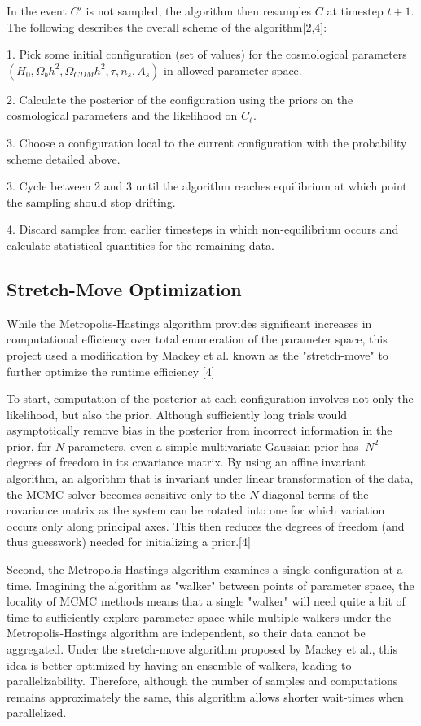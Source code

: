 \documentclass[aps,prd,final,twocolumn]{revtex4}
\begin{document}
In the event $C'$ is not sampled, the algorithm then resamples $C$ at timestep $t+1$. The following describes the overall scheme of the algorithm[2,4]:

1. Pick some initial configuration (set of values) for the cosmological parameters $(H_0, \Omega_b h^2, \Omega_{CDM} h^2, \tau, n_s, A_s)$ in allowed parameter space.

2. Calculate the posterior of the configuration using the priors on the cosmological parameters and the likelihood on $C_{\ell}$.

3. Choose a configuration local to the current configuration with the probability scheme detailed above.

3. Cycle between 2 and 3 until the algorithm reaches equilibrium at which point the sampling should stop drifting.

4. Discard samples from earlier timesteps in which non-equilibrium occurs and calculate statistical quantities for the remaining data.

\subsection{Stretch-Move Optimization}
While the Metropolis-Hastings algorithm provides significant increases in computational efficiency over total enumeration of the parameter space, this project used a modification by Mackey et al. known as the "stretch-move" to further optimize the runtime efficiency [4]

To start, computation of the posterior at each configuration involves not only the likelihood, but also the prior. Although sufficiently long trials would asymptotically remove bias in the posterior from incorrect information in the prior, for $N$ parameters, even a simple multivariate Gaussian prior has $~N^2$ degrees of freedom in its covariance matrix. By using an affine invariant algorithm, an algorithm that is invariant under linear transformation of the data, the MCMC solver becomes sensitive only to the $N$ diagonal terms of the covariance matrix as the system can be rotated into one for which variation occurs only along principal axes. This then reduces the degrees of freedom (and thus guesswork) needed for initializing a prior.[4]

Second, the Metropolis-Hastings algorithm examines a single configuration at a time. Imagining the algorithm as  "walker" between points of parameter space, the locality of MCMC methods means that a single "walker" will need quite a bit of time to sufficiently explore parameter space while multiple walkers under the Metropolis-Hastings algorithm are independent, so their data cannot be aggregated. Under the stretch-move algorithm proposed by Mackey et al., this idea is better optimized by having an ensemble of walkers, leading to parallelizability. Therefore, although the number of samples and computations remains approximately the same, this algorithm allows shorter wait-times when parallelized.
\end{document}
